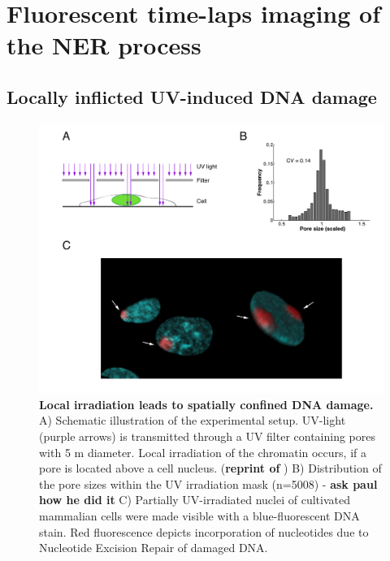 	
	
\section{Fluorescent time-laps imaging of the NER process}

\subsection{Locally inflicted UV-induced DNA damage}

\begin{figure}[htbp]
	\begin{center}
		\includegraphics[width=1\textwidth]{Abbildungen/figure2_1.pdf}
		\caption{\textbf{Local irradiation leads to spatially confined DNA damage.} A) Schematic illustration of the experimental setup. UV-light (purple arrows) is transmitted through a UV filter containing pores with 5 \textmu m diameter. Local irradiation of the chromatin occurs, if a pore is located above a cell nucleus. (\textbf{reprint of }) B) Distribution of the pore sizes within the UV irradiation mask (n=5008) - \textbf{ask paul how he did it} C) Partially UV-irradiated nuclei of cultivated mammalian cells were made visible with a blue-fluorescent DNA stain. Red fluorescence depicts incorporation of nucleotides due to Nucleotide Excision Repair of damaged DNA.}
		\label{fig:accuMethod}
	\end{center}
\end{figure} 


